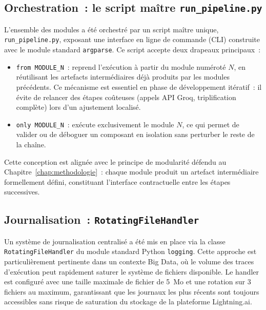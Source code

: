 \subsection{Orchestration~: le script maître \texttt{run\_pipeline.py}}
\label{subsec:orchestration}

L'ensemble des modules a été orchestré par un script maître unique,
\texttt{run\_pipeline.py}, exposant une interface en ligne de commande
(CLI) construite avec le module standard \texttt{argparse}. Ce script
accepte deux drapeaux principaux~:

\begin{itemize}
    \item \texttt{from MODULE\_N}~: reprend l'exécution à partir du
    module numéroté $N$, en réutilisant les artefacts intermédiaires
    déjà produits par les modules précédents. Ce mécanisme est essentiel
    en phase de développement itératif~: il évite de relancer des étapes
    coûteuses (appels API Groq, triplification complète) lors d'un
    ajustement localisé.
  \item \texttt{only MODULE\_N}~: exécute exclusivement le module
    $N$, ce qui permet de valider ou de déboguer un composant en
    isolation sans perturber le reste de la chaîne.
\end{itemize}

\noindent Cette conception est alignée avec le principe de modularité
défendu au Chapitre~\ref{chap:methodologie}~: chaque module produit un
artefact intermédiaire formellement défini, constituant l'interface
contractuelle entre les étapes successives.

\subsection{Journalisation~: \texttt{RotatingFileHandler}}
\label{subsec:logging}

Un système de journalisation centralisé a été mis en place via la
classe \\ \texttt{RotatingFileHandler} du module standard Python
\texttt{logging}. Cette approche est particulièrement pertinente dans
un contexte Big Data, où le volume des traces d'exécution peut
rapidement saturer le système de fichiers disponible. Le handler est
configuré avec une taille maximale de fichier de 5~Mo et une rotation
sur 3 fichiers au maximum, garantissant que les journaux les plus
récents sont toujours accessibles sans risque de saturation du
stockage de la plateforme Lightning.ai.


